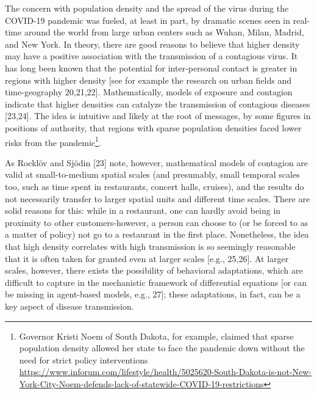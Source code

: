 \documentclass[10pt,letterpaper]{article}
\begin{document}
The concern with population density and the spread of the virus during
the COVID-19 pandemic was fueled, at least in part, by dramatic scenes
seen in real-time around the world from large urban centers such as
Wuhan, Milan, Madrid, and New York. In theory, there are good reasons to
believe that higher density may have a positive association with the
transmission of a contagious virus. It has long been known that the
potential for inter-personal contact is greater in regions with higher
density {[}see for example the research on urban fields and
time-geography 20,21,22{]}. Mathematically, models of exposure and
contagion indicate that higher densities can catalyze the transmission
of contagious diseases {[}23,24{]}. The idea is intuitive and likely at
the root of messages, by some figures in positions of authority, that
regions with sparse population densities faced lower risks from the
pandemic\footnote{Governor Kristi Noem of South Dakota, for example,
  claimed that sparse population density allowed her state to face the
  pandemic down without the need for strict policy interventions
  \url{https://www.inforum.com/lifestyle/health/5025620-South-Dakota-is-not-New-York-City-Noem-defends-lack-of-statewide-COVID-19-restrictions}}.

As Rocklöv and Sjödin {[}23{]} note, however, mathematical models of
contagion are valid at small-to-medium spatial scales (and presumably,
small temporal scales too, such as time spent in restaurants, concert
halls, cruises), and the results do not necessarily transfer to larger
spatial units and different time scales. There are solid reasons for
this: while in a restaurant, one can hardly avoid being in proximity to
other customers-however, a person can choose to (or be forced to as a
matter of policy) not go to a restaurant in the first place.
Nonetheless, the idea that high density correlates with high
transmission is so seemingly reasonable that it is often taken for
granted even at larger scales {[}e.g., 25,26{]}. At larger scales,
however, there exists the possibility of behavioral adaptations, which
are difficult to capture in the mechanistic framework of differential
equations {[}or can be missing in agent-based models, e.g., 27{]}; these
adaptations, in fact, can be a key aspect of disease transmission.
\end{document}
